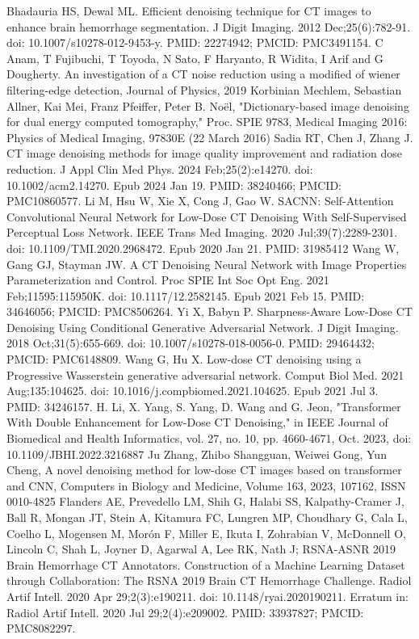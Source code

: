 \documentclass{article}
\begin{document}
\begin{thebibliography}{99}
Bhadauria HS, Dewal ML. Efficient denoising technique for CT images to enhance brain hemorrhage segmentation. J Digit Imaging. 2012 Dec;25(6):782-91. doi: 10.1007/s10278-012-9453-y. PMID: 22274942; PMCID: PMC3491154.
C Anam, T Fujibuchi, T Toyoda, N Sato, F Haryanto, R Widita, I Arif and G Dougherty. An investigation of a CT noise reduction using a modified of wiener filtering-edge detection, Journal of Physics, 2019
Korbinian Mechlem, Sebastian Allner, Kai Mei, Franz Pfeiffer, Peter B. Noël, "Dictionary-based image denoising for dual energy computed tomography," Proc. SPIE 9783, Medical Imaging 2016: Physics of Medical Imaging, 97830E (22 March 2016)
Sadia RT, Chen J, Zhang J. CT image denoising methods for image quality improvement and radiation dose reduction. J Appl Clin Med Phys. 2024 Feb;25(2):e14270. doi: 10.1002/acm2.14270. Epub 2024 Jan 19. PMID: 38240466; PMCID: PMC10860577.
Li M, Hsu W, Xie X, Cong J, Gao W. SACNN: Self-Attention Convolutional Neural Network for Low-Dose CT Denoising With Self-Supervised Perceptual Loss Network. IEEE Trans Med Imaging. 2020 Jul;39(7):2289-2301. doi: 10.1109/TMI.2020.2968472. Epub 2020 Jan 21. PMID: 31985412
Wang W, Gang GJ, Stayman JW. A CT Denoising Neural Network with Image Properties Parameterization and Control. Proc SPIE Int Soc Opt Eng. 2021 Feb;11595:115950K. doi: 10.1117/12.2582145. Epub 2021 Feb 15. PMID: 34646056; PMCID: PMC8506264.
Yi X, Babyn P. Sharpness-Aware Low-Dose CT Denoising Using Conditional Generative Adversarial Network. J Digit Imaging. 2018 Oct;31(5):655-669. doi: 10.1007/s10278-018-0056-0. PMID: 29464432; PMCID: PMC6148809.
Wang G, Hu X. Low-dose CT denoising using a Progressive Wasserstein generative adversarial network. Comput Biol Med. 2021 Aug;135:104625. doi: 10.1016/j.compbiomed.2021.104625. Epub 2021 Jul 3. PMID: 34246157.
H. Li, X. Yang, S. Yang, D. Wang and G. Jeon, "Transformer With Double Enhancement for Low-Dose CT Denoising," in IEEE Journal of Biomedical and Health Informatics, vol. 27, no. 10, pp. 4660-4671, Oct. 2023, doi: 10.1109/JBHI.2022.3216887
Ju Zhang, Zhibo Shangguan, Weiwei Gong, Yun Cheng, A novel denoising method for low-dose CT images based on transformer and CNN, Computers in Biology and Medicine, Volume 163, 2023, 107162, ISSN 0010-4825
Flanders AE, Prevedello LM, Shih G, Halabi SS, Kalpathy-Cramer J, Ball R, Mongan JT, Stein A, Kitamura FC, Lungren MP, Choudhary G, Cala L, Coelho L, Mogensen M, Morón F, Miller E, Ikuta I, Zohrabian V, McDonnell O, Lincoln C, Shah L, Joyner D, Agarwal A, Lee RK, Nath J; RSNA-ASNR 2019 Brain Hemorrhage CT Annotators. Construction of a Machine Learning Dataset through Collaboration: The RSNA 2019 Brain CT Hemorrhage Challenge. Radiol Artif Intell. 2020 Apr 29;2(3):e190211. doi: 10.1148/ryai.2020190211. Erratum in: Radiol Artif Intell. 2020 Jul 29;2(4):e209002. PMID: 33937827; PMCID: PMC8082297.

 \end{thebibliography}
\end{document}
